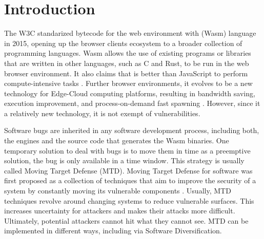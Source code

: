 \chapter{Introduction}



\newcommand{\subscript}[2]{$#1 _ #2$}

\newcommand{\rqone}{To what extent can we artifically generate program variants for WebAssembly?}

\newcommand{\rqtwo}{To what extent are the generated variants dynamically different?}
\newcommand{\rqthree}{To what extent do the artificial variants exhibit different execution times on Edge-Cloud platforms?}



The W3C standarized bytecode for the web environment with \wasm (Wasm) language in 2015, opening up the browser clients ecosystem to a broader collection of programming languages. Wasm allows the use of existing programs or libraries that are written in other languages, such as C and Rust, to be run in the web browser environment. It also claims that is better than JavaScript to perform compute-intensive tasks \cite{Haas_2017}. 
Further browser environments, it evolves to be a new technology for Edge-Cloud computing platforms, resulting in bandwidth saving, execution improvement, and process-on-demand fast spawning \cite{9640153, wen2020wasmachine}. However, since it a relatively new technology, it is not exempt of vulnerabilities.

Software bugs are inherited in any software development process, including both, the \wasm engines and the source code that generates the Wasm binaries. One temporary solution to deal with bugs is to move them in time as a preemptive solution, the bug is only available in a time window. This strategy is usually called Moving Target Defense (MTD).  Moving Target Defense for software was first proposed as a collection of techniques that aim to improve the security of a system by constantly moving its vulnerable components \cite{MTDNationalCyberLaep, okhravi2013survey}. Usually, MTD techniques revolve around changing systems to reduce vulnerable surfaces. This increases uncertainty for attackers and makes their attacks more difficult. Ultimately, potential attackers cannot hit what they cannot see. MTD can be implemented in different ways, including via Software Diversification. 

